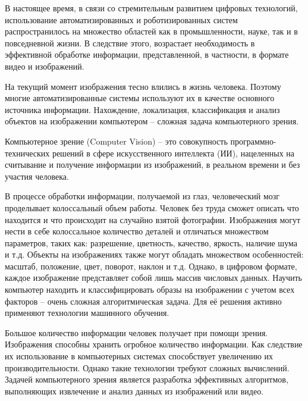 В настоящее время, в связи со стремительным развитием цифровых технологий, использование автоматизированных и роботизированных систем распространилось на множество областей как в промышленности, науке, так и в повседневной жизни. В следствие этого, возрастает необходимость в эффективной обработке информации, представленной, в частности, в формате видео и изображений. 

На текущий момент изображения тесно влились в жизнь человека. Поэтому многие автоматизированные системы используют их в качестве основного источника информации. Нахождение, локализация, классификация и анализ объектов на изображении компьютером – сложная задача компьютерного зрения. 

Компьютерное зрение (Computer Vision) – это совокупность программно-технических решений в сфере искусственного интеллекта (ИИ), нацеленных на считывание и получение информации из изображений, в реальном времени и без участия человека. 

В процессе обработки информации, получаемой из глаз, человеческий мозг проделывает колоссальный объем работы. Человек без труда сможет описать что находится и что происходит на случайно взятой фотографии. Изображения могут нести в себе колоссальное количество деталей и отличаться множеством параметров, таких как: разрешение, цветность, качество, яркость, наличие шума и т.д. Объекты на изображениях также могут обладать множеством особенностей: масштаб, положение, цвет, поворот, наклон и т.д. Однако, в цифровом формате, каждое изображение представляет собой лишь массив числовых данных.  Научить компьютер находить и классифицировать образы на изображении с учетом всех факторов – очень сложная алгоритмическая задача. Для её решения активно применяют технологии машинного обучения.

Большое количество информации человек получает при помощи зрения. 
Изображения способны хранить огробное количество информации. Как следствие их использование в компьютерных системах способствует увеличению их производительности. Однако такие технологии требуют сложных вычислений. Задачей компьютерного зрения является разработка эффективных алгоритмов, выполняющих извлечение и анализ данных из изображений или видео. 
 
